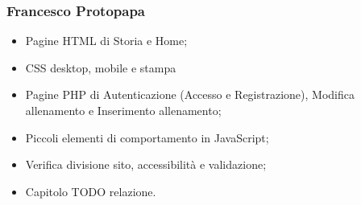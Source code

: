 \documentclass[a4paper]{article}
\begin{document}
	\subsubsection{Francesco Protopapa}
	\begin{itemize}
		\item Pagine HTML di Storia e Home;
		\item CSS desktop, mobile e stampa
		\item Pagine PHP di Autenticazione (Accesso e Registrazione), Modifica allenamento e Inserimento allenamento;
		\item Piccoli elementi di comportamento in JavaScript;
		\item Verifica divisione sito, accessibilità e validazione;
		\item Capitolo TODO relazione.        
	\end{itemize}
\end{document}
